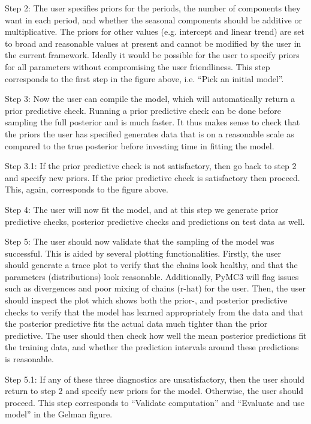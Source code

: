 \documentclass{article}
\begin{document}
\noindent Step 2: The user specifies priors for the periods, the number of components they want in each period, and whether the seasonal components should be additive or multiplicative. The priors for other values (e.g. intercept and linear trend) are set to broad and reasonable values at present and cannot be modified by the user in the current framework. Ideally it would be possible for the user to specify priors for all parameters without compromising the user friendliness. This step corresponds to the first step in the figure above, i.e. “Pick an initial model”. 

\noindent Step 3: Now the user can compile the model, which will automatically return a prior predictive check. Running a prior predictive check can be done before sampling the full posterior and is much faster. It thus makes sense to check that the priors the user has specified generates data that is on a reasonable scale as compared to the true posterior before investing time in fitting the model.

\noindent Step 3.1: If the prior predictive check is not satisfactory, then go back to step 2 and specify new priors. If the prior predictive check is satisfactory then proceed. This, again, corresponds to the figure above.

\noindent Step 4: The user will now fit the model, and at this step we generate prior predictive checks, posterior predictive checks and predictions on test data as well. 

\noindent Step 5: The user should now validate that the sampling of the model was successful. This is aided by several plotting functionalities. Firstly, the user should generate a trace plot to verify that the chains look healthy, and that the parameters (distributions) look reasonable. Additionally, PyMC3 will flag issues such as divergences and poor mixing of chains (r-hat) for the user. Then, the user should inspect the plot which shows both the prior-, and posterior predictive checks to verify that the model has learned appropriately from the data and that the posterior predictive fits the actual data much tighter than the prior predictive. The user should then check how well the mean posterior predictions fit the training data, and whether the prediction intervals around these predictions is reasonable. 

\noindent Step 5.1: If any of these three diagnostics are unsatisfactory, then the user should return to step 2 and specify new priors for the model. Otherwise, the user should proceed. This step corresponds to “Validate computation” and “Evaluate and use model” in the Gelman figure.
\end{document}
